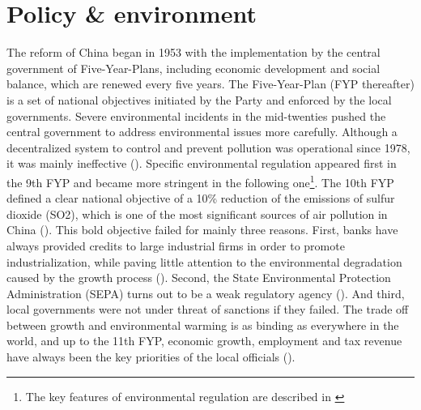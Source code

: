 \documentclass[12pt]{article}
\begin{document}
\section{Policy \& environment} \label{sec:Policy}

The reform of China began in 1953 with the implementation by the central government of Five-Year-Plans, including economic development and social balance, which are renewed every five years. The Five-Year-Plan (FYP thereafter) is a set of national objectives initiated by the Party and enforced by the local governments. Severe environmental incidents in the mid-twenties pushed the central government to address environmental issues more carefully. Although a decentralized system to control and prevent pollution was operational since 1978, it was mainly ineffective (\cite{Xu2009-yw}). Specific environmental regulation appeared first in the 9th FYP and became more stringent in the following one\footnote{The key features of environmental regulation are described in \cite{Xu2011-sw}}.  The 10th FYP defined a clear national objective of a 10\% reduction of the emissions of sulfur dioxide (SO2), which is one of the most significant sources of air pollution in China (\cite{Yan2017-le}). This bold objective failed for mainly three reasons. First, banks have always provided credits to large industrial firms in order to promote industrialization, while paving little attention to the environmental degradation caused by the growth process (\cite{The_World_Bank2008-pn}). Second, the State Environmental Protection Administration (SEPA) turns out to be a weak regulatory agency (\cite{Stoerk2018-mx}). And third, local governments were not under threat of sanctions if they failed. The trade off between growth and environmental warming is as binding as everywhere in the world,  and up to the 11th FYP, economic growth, employment and tax revenue have always been the key priorities of the local officials (\cite{Jiang2014-pf, Chen2018-ki}).
\end{document}

